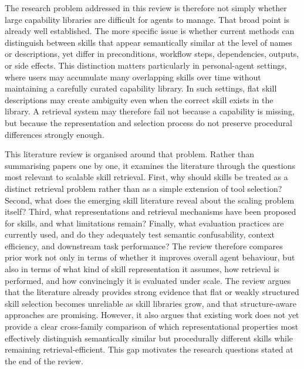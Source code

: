 \documentclass[a4paper]{article}
\begin{document}
The research problem addressed in this review is therefore not simply whether large capability libraries are difficult for agents to manage. That broad point is already well established. The more specific issue is whether current methods can distinguish between skills that appear semantically similar at the level of names or descriptions, yet differ in preconditions, workflow steps, dependencies, outputs, or side effects. This distinction matters particularly in personal-agent settings, where users may accumulate many overlapping skills over time without maintaining a carefully curated capability library. In such settings, flat skill descriptions may create ambiguity even when the correct skill exists in the library. A retrieval system may therefore fail not because a capability is missing, but because the representation and selection process do not preserve procedural differences strongly enough.

This literature review is organised around that problem. Rather than summarising papers one by one, it examines the literature through the questions most relevant to scalable skill retrieval. First, why should skills be treated as a distinct retrieval problem rather than as a simple extension of tool selection? Second, what does the emerging skill literature reveal about the scaling problem itself? Third, what representations and retrieval mechanisms have been proposed for skills, and what limitations remain? Finally, what evaluation practices are currently used, and do they adequately test semantic confusability, context efficiency, and downstream task performance? The review therefore compares prior work not only in terms of whether it improves overall agent behaviour, but also in terms of what kind of skill representation it assumes, how retrieval is performed, and how convincingly it is evaluated under scale. The review argues that the literature already provides strong evidence that flat or weakly structured skill selection becomes unreliable as skill libraries grow, and that structure-aware approaches are promising. However, it also argues that existing work does not yet provide a clear cross-family comparison of which representational properties most effectively distinguish semantically similar but procedurally different skills while remaining retrieval-efficient. This gap motivates the research questions stated at the end of the review.
\end{document}
